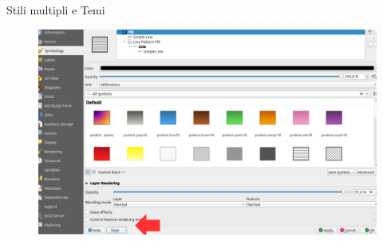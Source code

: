 \documentclass{beamer}
\begin{document}
{\begin{frame}{Stili multipli e Temi}
    
    \begin{figure}
         \centering
         \includegraphics[width=0.75\linewidth]{digitizing_pics/stili_multipli_2.png}
     
    \end{figure} 
\end{frame}



}
\end{document}
